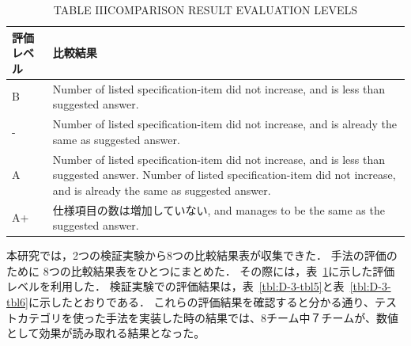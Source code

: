 \documentclass[a4paper,11pt]{jreport}
\begin{document}
\begin{table}[htbp]
  \centering
  \caption{TABLE IIICOMPARISON RESULT EVALUATION LEVELS}
    \begin{tabular}{|l|p{14.855em}|}
       \hline
    評価レベル & \multicolumn{1}{l|}{比較結果} \\
        \hline
     B    & Number of listed specification-item did not increase, and is less than suggested answer.  \\
        \hline
    -     & Number of listed specification-item did not increase, and is already the same as suggested answer.  \\
        \hline
    A     & Number of listed specification-item did not increase, and is less than suggested answer. Number of listed specification-item did not increase, and is already the same as suggested answer.  \\
       \hline
    A+    & 仕様項目の数は増加していない, and manages to be the same as the suggested answer.  \\
        \hline
    \end{tabular}%
  \label{tbl:D-3-tbl4}%
\end{table}%

  本研究では，2つの検証実験から8つの比較結果表が収集できた．
  手法の評価のために 8つの比較結果表をひとつにまとめた．
その際には，表~\ref{tbl:D-3-tbl4}に示した評価レベルを利用した． 検証実験での評価結果は，表~\ref{tbl:D-3-tbl5}と表~\ref{tbl:D-3-tbl6}に示したとおりである．
これらの評価結果を確認すると分かる通り、テストカテゴリを使った手法を実装した時の結果では、8チーム中７チームが、数値として効果が読み取れる結果となった。
\end{document}
